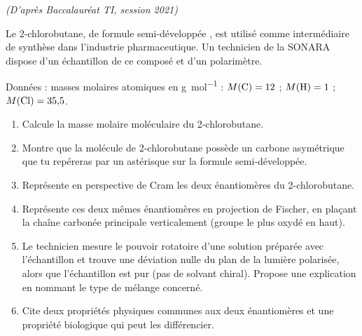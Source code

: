 \documentclass[11pt]{article}
\begin{document}
\begin{exercice}
\emph{(D'après Baccalauréat TI, session 2021)}

Le 2-chlorobutane, de formule semi-développée , est utilisé comme intermédiaire de synthèse dans l'industrie pharmaceutique. Un technicien de la SONARA dispose d'un échantillon de ce composé et d'un polarimètre.

Données : masses molaires atomiques en \si{g.mol^{-1}} : $M(\ce{C}) = 12$ ; $M(\ce{H}) = 1$ ; $M(\ce{Cl}) = 35{,}5$.
\begin{enumerate}
\item Calcule la masse molaire moléculaire du 2-chlorobutane.
\item Montre que la molécule de 2-chlorobutane possède un carbone asymétrique que tu repéreras par un astérisque sur la formule semi-développée.
\item Représente en perspective de Cram les deux énantiomères du 2-chlorobutane.
\item Représente ces deux mêmes énantiomères en projection de Fischer, en plaçant la chaîne carbonée principale verticalement (groupe le plus oxydé en haut).
\item Le technicien mesure le pouvoir rotatoire d'une solution préparée avec l'échantillon et trouve une déviation nulle du plan de la lumière polarisée, alors que l'échantillon est pur (pas de solvant chiral). Propose une explication en nommant le type de mélange concerné.
\item Cite deux propriétés physiques communes aux deux énantiomères et une propriété biologique qui peut les différencier.
\end{enumerate}
\end{exercice}
\end{document}
